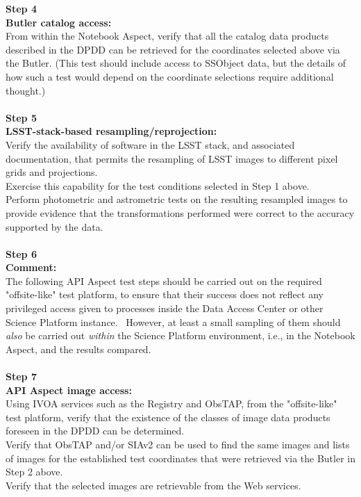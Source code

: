 \textbf{Step 4}\\
\textbf{Butler catalog access:}\\
From within the Notebook Aspect, verify that all the catalog data
products described in the DPDD can be retrieved for the coordinates
selected above via the Butler. (This test should include access to
SSObject data, but the details of how such a test would depend on the
coordinate selections require additional thought.)\\
~\\
\textbf{Step 5}\\
\textbf{LSST-stack-based resampling/reprojection:}\\
Verify the availability of software in the LSST stack, and associated
documentation, that permits the resampling of LSST images to different
pixel grids and projections.\\
Exercise this capability for the test conditions selected in Step 1
above.\\
Perform photometric and astrometric tests on the resulting resampled
images to provide evidence that the transformations performed were
correct to the accuracy supported by the data.\\
~\\
\textbf{Step 6}\\
\textbf{Comment:}\\
The following API Aspect test steps should be carried out on the
required "offsite-like" test platform, to ensure that their success does
not reflect any privileged access given to processes inside the Data
Access Center or other Science Platform instance. ~However, at least a
small sampling of them should \emph{also} be carried out \emph{within}
the Science Platform environment, i.e., in the Notebook Aspect, and the
results compared.\\
~\\
\textbf{Step 7}\\
\textbf{API Aspect image access:}\\
Using IVOA services such as the Registry and ObsTAP, from the
"offsite-like" test platform, verify that the existence of the classes
of image data products foreseen in the DPDD can be determined.\\
Verify that ObsTAP and/or SIAv2 can be used to find the same images and
lists of images for the established test coordinates that were retrieved
via the Butler in Step 2 above.\\
Verify that the selected images are retrievable from the Web services.\\
